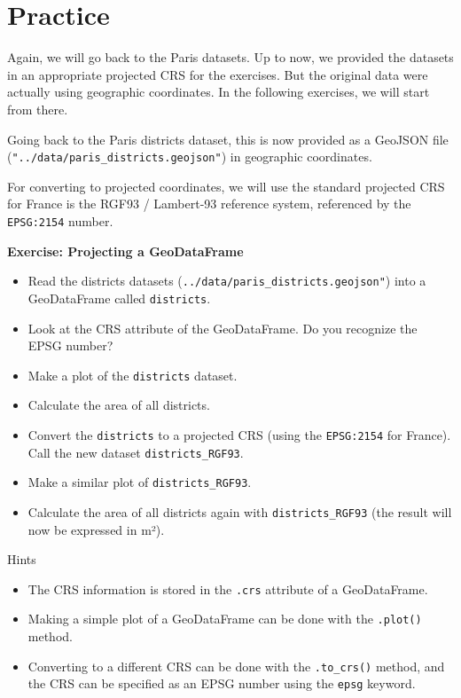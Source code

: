\documentclass[
  letterpaper,
  DIV=11,
  numbers=noendperiod]{scrreprt}
\providecommand{\tightlist}{%
  \setlength{\itemsep}{0pt}\setlength{\parskip}{0pt}}\usepackage{longtable,booktabs,array}
\begin{document}
\section{Practice}\label{practice-1}

Again, we will go back to the Paris datasets. Up to now, we provided the
datasets in an appropriate projected CRS for the exercises. But the
original data were actually using geographic coordinates. In the
following exercises, we will start from there.

Going back to the Paris districts dataset, this is now provided as a
GeoJSON file (\texttt{"../data/paris\_districts.geojson"}) in geographic
coordinates.

For converting to projected coordinates, we will use the standard
projected CRS for France is the RGF93 / Lambert-93 reference system,
referenced by the \texttt{EPSG:2154} number.

\textbf{Exercise: Projecting a GeoDataFrame}

\begin{itemize}
\tightlist
\item
  Read the districts datasets
  (\texttt{../data/paris\_districts.geojson"}) into a GeoDataFrame
  called \texttt{districts}.
\item
  Look at the CRS attribute of the GeoDataFrame. Do you recognize the
  EPSG number?
\item
  Make a plot of the \texttt{districts} dataset.
\item
  Calculate the area of all districts.
\item
  Convert the \texttt{districts} to a projected CRS (using the
  \texttt{EPSG:2154} for France). Call the new dataset
  \texttt{districts\_RGF93}.
\item
  Make a similar plot of \texttt{districts\_RGF93}.
\item
  Calculate the area of all districts again with
  \texttt{districts\_RGF93} (the result will now be expressed in m²).
\end{itemize}

Hints

\begin{itemize}
\tightlist
\item
  The CRS information is stored in the \texttt{.crs} attribute of a
  GeoDataFrame.
\item
  Making a simple plot of a GeoDataFrame can be done with the
  \texttt{.plot()} method.
\item
  Converting to a different CRS can be done with the \texttt{.to\_crs()}
  method, and the CRS can be specified as an EPSG number using the
  \texttt{epsg} keyword.
\end{itemize}
\end{document}
